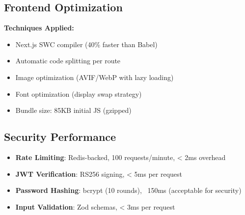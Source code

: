 \subsection{Frontend Optimization}

\textbf{Techniques Applied:}
\begin{itemize}[leftmargin=*,topsep=3pt,itemsep=2pt]
    \item Next.js SWC compiler (40\% faster than Babel)
    \item Automatic code splitting per route
    \item Image optimization (AVIF/WebP with lazy loading)
    \item Font optimization (display swap strategy)
    \item Bundle size: 85KB initial JS (gzipped)
\end{itemize}

\subsection{Security Performance}

\begin{itemize}[leftmargin=*,topsep=3pt,itemsep=2pt]
    \item \textbf{Rate Limiting}: Redis-backed, 100 requests/minute, < 2ms overhead
    \item \textbf{JWT Verification}: RS256 signing, < 5ms per request
    \item \textbf{Password Hashing}: bcrypt (10 rounds), ~150ms (acceptable for security)
    \item \textbf{Input Validation}: Zod schemas, < 3ms per request
\end{itemize}
